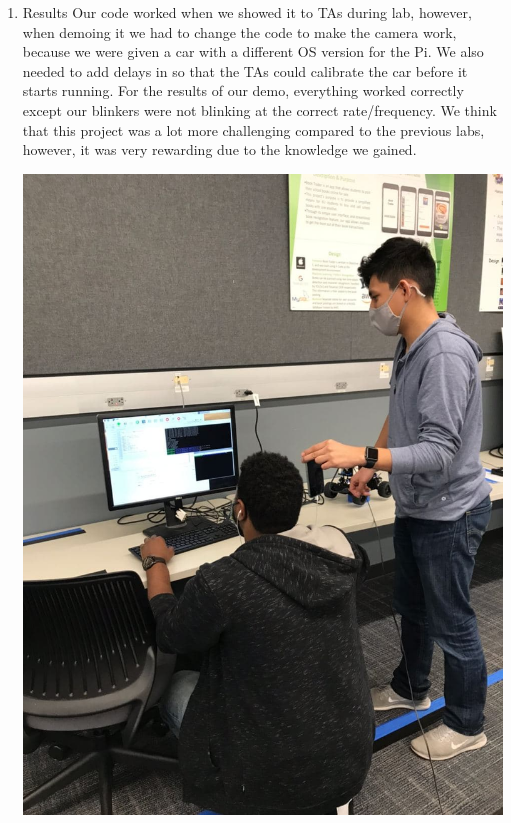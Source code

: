 \documentclass[11pt]{article}
\begin{document}
\begin{enumerate}
\item Results
\label{sec:orgcd361e5}
Our code worked when we showed it to TAs during lab, however, when
demoing it we had to change the code to make the camera work,
because we were given a car with a different OS version for the
Pi. We also needed to add delays in so that the TAs could calibrate
the car before it starts running. For the results of our demo,
everything worked correctly except our blinkers were not blinking
at the correct rate/frequency. We think that this project was a lot
more challenging compared to the previous labs, however, it was
very rewarding due to the knowledge we gained.

\begin{center}
\includegraphics[width=.9\linewidth]{./anticol_1.jpg}
\end{center}


\end{enumerate}
\end{document}
